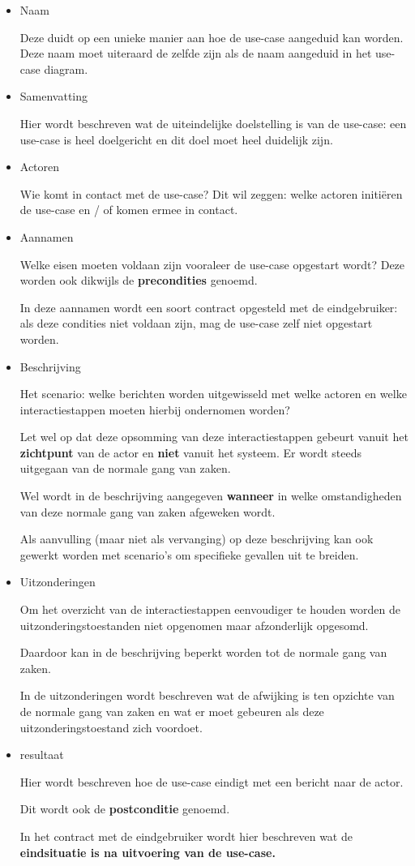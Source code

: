 \begin{itemize}
    \item Naam
    
    Deze duidt op een unieke manier aan hoe de use-case aangeduid kan worden. Deze naam moet uiteraard de zelfde zijn als de naam aangeduid in het use- case diagram.
    \item Samenvatting
    
    Hier wordt beschreven wat de uiteindelijke doelstelling is van de use-case: een use-case is heel doelgericht en dit doel moet heel duidelijk zijn.
    \item Actoren
    
    Wie komt in contact met de use-case? Dit wil zeggen: welke actoren initiëren de use-case en / of komen ermee in contact.
    \item Aannamen
    
    Welke eisen moeten voldaan zijn vooraleer de use-case opgestart wordt? Deze worden ook dikwijls de \textbf{precondities} genoemd.
    
In deze aannamen wordt een soort contract opgesteld met de eindgebruiker: als deze condities niet voldaan zijn, mag de use-case zelf niet opgestart worden.
    \item Beschrijving
    
    Het scenario: welke berichten worden uitgewisseld met welke actoren en welke interactiestappen moeten hierbij ondernomen worden?
    
    Let wel op dat deze opsomming van deze interactiestappen gebeurt vanuit het \textbf{zichtpunt} van de actor en \textbf{niet} vanuit het systeem. Er wordt steeds uitgegaan van de normale gang van zaken.
    
    Wel wordt in de beschrijving aangegeven \textbf{wanneer} in welke omstandigheden van deze normale gang van zaken afgeweken wordt.
    
    Als aanvulling (maar niet als vervanging) op deze beschrijving kan ook gewerkt worden met scenario's om specifieke gevallen uit te breiden.
    \item Uitzonderingen
    
    Om het overzicht van de interactiestappen eenvoudiger te houden worden de uitzonderingstoestanden niet opgenomen maar afzonderlijk opgesomd.
    
    Daardoor kan in de beschrijving beperkt worden tot de normale gang van zaken. 
    
    In de uitzonderingen wordt beschreven wat de afwijking is ten opzichte van de normale gang van zaken en wat er moet gebeuren als deze uitzonderingstoestand zich voordoet.
    
    \item resultaat
    
    Hier wordt beschreven hoe de use-case eindigt met een bericht naar de actor. 
    
    Dit wordt ook de \textbf{postconditie} genoemd.
    
    In het contract met de eindgebruiker wordt hier beschreven wat de \textbf{eindsituatie is na uitvoering van de use-case.}
\end{itemize}

